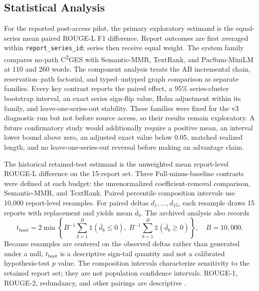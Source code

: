 \documentclass[information,article,submit,moreauthors]{Definitions/mdpi}
\newcommand{\cges}{C\textsuperscript{2}GES}
\begin{document}
\subsection{Statistical Analysis}

For the reported post-access pilot, the primary exploratory estimand is the equal-series mean paired ROUGE-L F1 difference. Report outcomes are first averaged within \texttt{report\_series\_id}; series then receive equal weight. The system family compares no-path \cges{} with Semantic-MMR, TextRank, and PacSum-MiniLM at 110 and 260 words. The component analysis treats the AB incremental chain, reservation--path factorial, and typed--untyped graph comparison as separate families. Every key contrast reports the paired effect, a 95\% series-cluster bootstrap interval, an exact series sign-flip value, Holm adjustment within its family, and leave-one-series-out stability. These families were fixed for the v3 diagnostic run but not before source access, so their results remain exploratory. A future confirmatory study would additionally require a positive mean, an interval lower bound above zero, an adjusted exact value below 0.05, matched realized length, and no leave-one-series-out reversal before making an advantage claim.

The historical retained-test estimand is the unweighted mean report-level ROUGE-L difference on the 15-report set. Three Full-minus-baseline contrasts were defined at each budget: the unrenormalized coefficient-removal comparison, Semantic-MMR, and TextRank. Paired percentile composition intervals use 10,000 report-level resamples. For paired deltas $d_1,\ldots,d_{15}$, each resample draws 15 reports with replacement and yields mean $\bar d_b$. The archived analysis also records
\begin{equation}
t_{\mathrm{boot}}=2\min\left\{B^{-1}\sum_{b=1}^{B}\mathbb{1}(\bar d_b\leq0),\;B^{-1}\sum_{b=1}^{B}\mathbb{1}(\bar d_b\geq0)\right\},\quad B=10{,}000.
\label{eq:tboot}
\end{equation}
Because resamples are centered on the observed deltas rather than generated under a null, $t_{\mathrm{boot}}$ is a descriptive sign-tail quantity and not a calibrated hypothesis-test $p$ value. The composition intervals characterize sensitivity to the retained report set; they are not population confidence intervals. ROUGE-1, ROUGE-2, redundancy, and other pairings are descriptive \cite{cameron2008bootstrap}.
\end{document}
